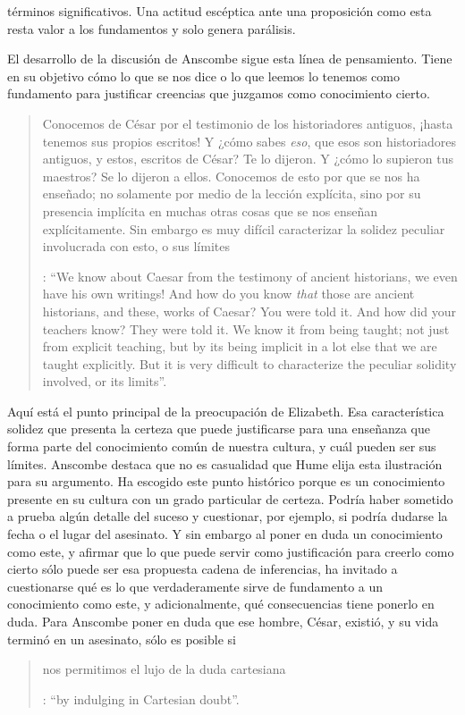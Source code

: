 términos significativos. Una actitud escéptica ante una proposición como esta resta valor a los fundamentos y solo genera parálisis.

El desarrollo de la discusión de Anscombe sigue esta línea de pensamiento. Tiene en su objetivo cómo lo que se nos dice o lo que leemos lo tenemos como fundamento para justificar creencias que juzgamos como conocimiento cierto.

\blockquote[{\Cite[90]{anscombe1981parmenides:humeandjulius}}: \enquote{We know about Caesar from the testimony of ancient historians, we even have his own writings! And how do you know \emph{that} those are ancient historians, and these, works of Caesar? You were told it. And how did your teachers know? They were told it. We know it from being taught; not just from explicit teaching, but by its being implicit in a lot else that we are taught explicitly. But it is very difficult to characterize the peculiar solidity involved, or its limits}.]{Conocemos de César por el testimonio de los historiadores antiguos, ¡hasta tenemos sus propios escritos! Y ¿cómo sabes \emph{eso}, que esos son historiadores antiguos, y estos, escritos de César? Te lo dijeron. Y ¿cómo lo supieron tus maestros? Se lo dijeron a ellos. Conocemos de esto por que se nos ha enseñado; no solamente por medio de la lección explícita, sino por su presencia implícita en muchas otras cosas que se nos enseñan explícitamente. Sin embargo es muy difícil caracterizar la solidez peculiar involucrada con esto, o sus límites}. Aquí está el punto principal de la preocupación de Elizabeth. Esa característica solidez que presenta la certeza que puede justificarse para una enseñanza que forma parte del conocimiento común de nuestra cultura, y cuál pueden ser sus límites. Anscombe destaca que no es casualidad que Hume elija esta ilustración para su argumento. Ha escogido este punto histórico porque es un conocimiento presente en su cultura con un grado particular de certeza. Podría haber sometido a prueba algún detalle del suceso y cuestionar, por ejemplo, si podría dudarse la fecha o el lugar del asesinato. Y sin embargo al poner en duda un conocimiento como este, y afirmar que lo que puede servir como justificación para creerlo como cierto sólo puede ser esa propuesta cadena de inferencias, ha invitado a cuestionarse qué es lo que verdaderamente sirve de fundamento a un conocimiento como este, y adicionalmente, qué consecuencias tiene ponerlo en duda. Para Anscombe poner en duda que ese hombre, César, existió, y su vida terminó en un asesinato, sólo es posible si \blockquote[{\Cite[Cf.][90]{anscombe1981parmenides:humeandjulius}}: \enquote{by indulging in Cartesian doubt}.]{nos permitimos el lujo de la duda cartesiana}.

